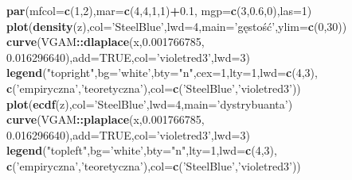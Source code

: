\documentclass[polish,]{book}
\newenvironment{Shaded}{\begin{snugshade}}{\end{snugshade}}
\newcommand{\DataTypeTok}[1]{\textcolor[rgb]{0.13,0.29,0.53}{#1}}
\newcommand{\DecValTok}[1]{\textcolor[rgb]{0.00,0.00,0.81}{#1}}
\newcommand{\FloatTok}[1]{\textcolor[rgb]{0.00,0.00,0.81}{#1}}
\newcommand{\KeywordTok}[1]{\textcolor[rgb]{0.13,0.29,0.53}{\textbf{#1}}}
\newcommand{\NormalTok}[1]{#1}
\newcommand{\OperatorTok}[1]{\textcolor[rgb]{0.81,0.36,0.00}{\textbf{#1}}}
\newcommand{\OtherTok}[1]{\textcolor[rgb]{0.56,0.35,0.01}{#1}}
\newcommand{\StringTok}[1]{\textcolor[rgb]{0.31,0.60,0.02}{#1}}
\begin{document}
\begin{Shaded}
\begin{Highlighting}[]
\KeywordTok{par}\NormalTok{(}\DataTypeTok{mfcol=}\KeywordTok{c}\NormalTok{(}\DecValTok{1}\NormalTok{,}\DecValTok{2}\NormalTok{),}\DataTypeTok{mar=}\KeywordTok{c}\NormalTok{(}\DecValTok{4}\NormalTok{,}\DecValTok{4}\NormalTok{,}\DecValTok{1}\NormalTok{,}\DecValTok{1}\NormalTok{)}\OperatorTok{+}\FloatTok{0.1}\NormalTok{, }\DataTypeTok{mgp=}\KeywordTok{c}\NormalTok{(}\DecValTok{3}\NormalTok{,}\FloatTok{0.6}\NormalTok{,}\DecValTok{0}\NormalTok{),}\DataTypeTok{las=}\DecValTok{1}\NormalTok{)}
\KeywordTok{plot}\NormalTok{(}\KeywordTok{density}\NormalTok{(z),}\DataTypeTok{col=}\StringTok{'SteelBlue'}\NormalTok{,}\DataTypeTok{lwd=}\DecValTok{4}\NormalTok{,}\DataTypeTok{main=}\StringTok{'gęstość'}\NormalTok{,}\DataTypeTok{ylim=}\KeywordTok{c}\NormalTok{(}\DecValTok{0}\NormalTok{,}\DecValTok{30}\NormalTok{))}
\KeywordTok{curve}\NormalTok{(VGAM}\OperatorTok{::}\KeywordTok{dlaplace}\NormalTok{(x,}\FloatTok{0.001766785}\NormalTok{, }\FloatTok{0.016296640}\NormalTok{),}\DataTypeTok{add=}\OtherTok{TRUE}\NormalTok{,}\DataTypeTok{col=}\StringTok{'violetred3'}\NormalTok{,}\DataTypeTok{lwd=}\DecValTok{3}\NormalTok{)}
\KeywordTok{legend}\NormalTok{(}\StringTok{"topright"}\NormalTok{,}\DataTypeTok{bg=}\StringTok{'white'}\NormalTok{,}\DataTypeTok{bty=}\StringTok{"n"}\NormalTok{,}\DataTypeTok{cex=}\DecValTok{1}\NormalTok{,}\DataTypeTok{lty=}\DecValTok{1}\NormalTok{,}\DataTypeTok{lwd=}\KeywordTok{c}\NormalTok{(}\DecValTok{4}\NormalTok{,}\DecValTok{3}\NormalTok{),}
       \KeywordTok{c}\NormalTok{(}\StringTok{'empiryczna'}\NormalTok{,}\StringTok{'teoretyczna'}\NormalTok{),}\DataTypeTok{col=}\KeywordTok{c}\NormalTok{(}\StringTok{'SteelBlue'}\NormalTok{,}\StringTok{'violetred3'}\NormalTok{))}
\KeywordTok{plot}\NormalTok{(}\KeywordTok{ecdf}\NormalTok{(z),}\DataTypeTok{col=}\StringTok{'SteelBlue'}\NormalTok{,}\DataTypeTok{lwd=}\DecValTok{4}\NormalTok{,}\DataTypeTok{main=}\StringTok{'dystrybuanta'}\NormalTok{)}
\KeywordTok{curve}\NormalTok{(VGAM}\OperatorTok{::}\KeywordTok{plaplace}\NormalTok{(x,}\FloatTok{0.001766785}\NormalTok{, }\FloatTok{0.016296640}\NormalTok{),}\DataTypeTok{add=}\OtherTok{TRUE}\NormalTok{,}\DataTypeTok{col=}\StringTok{'violetred3'}\NormalTok{,}\DataTypeTok{lwd=}\DecValTok{3}\NormalTok{)}
\KeywordTok{legend}\NormalTok{(}\StringTok{"topleft"}\NormalTok{,}\DataTypeTok{bg=}\StringTok{'white'}\NormalTok{,}\DataTypeTok{bty=}\StringTok{"n"}\NormalTok{,}\DataTypeTok{lty=}\DecValTok{1}\NormalTok{,}\DataTypeTok{lwd=}\KeywordTok{c}\NormalTok{(}\DecValTok{4}\NormalTok{,}\DecValTok{3}\NormalTok{),}
       \KeywordTok{c}\NormalTok{(}\StringTok{'empiryczna'}\NormalTok{,}\StringTok{'teoretyczna'}\NormalTok{),}\DataTypeTok{col=}\KeywordTok{c}\NormalTok{(}\StringTok{'SteelBlue'}\NormalTok{,}\StringTok{'violetred3'}\NormalTok{))}
\end{Highlighting}
\end{Shaded}
\end{document}
